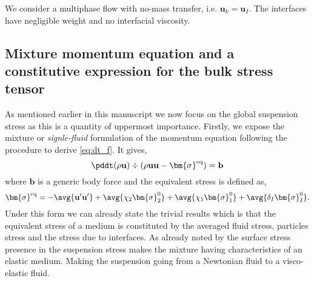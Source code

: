 
We consider a multiphase flow with no-mass transfer, i.e. $\textbf{u}_k=\textbf{u}_I$.
The interfaces have negligible weight and no interfacial viscosity. 

\subsection{Mixture momentum equation and a constitutive expression for the bulk stress tensor}

As mentioned earlier in this manuscript we  now focus on the global suspension stress as this is a quantity of uppermost importance. 
Firstly, we expose the mixture or \textit{signle-fluid} formulation of the momentum equation following the procedure to derive \ref{eq:dt_f}.
It gives, 
\begin{equation}
    \pddt (\rho \textbf{u})
    \div (\rho \textbf{uu} - \bm{\sigma}^\text{eq})
    = \textbf{b}
    \label{eq:dt_avg_rho_u}
\end{equation}
where $\textbf{b}$ is a generic body force and the equivalent stress is defined as, 
\begin{equation}
    \bm{\sigma}^\text{eq}
    = - \avg{\textbf{u}'\textbf{u}'}
    + \avg{\chi_2\bm{\sigma}_2^0}
    + \avg{\chi_1\bm{\sigma}_1^0}
    + \avg{\delta_I \bm{\sigma}_I^0}. 
    \label{eq:sigma_eq_def}
\end{equation}
Under this form we can already state the trivial results which is that the equivalent stress of a medium is constituted by the averaged fluid stress, particles stress and the stress due to interfaces. 
As already noted by \citet{batchelor1970stress} the surface stress presence in the suspension stress makes the mixture having characteristics of an elastic medium. 
Making the suspension going from a Newtonian fluid to a visco-elastic fluid. 

